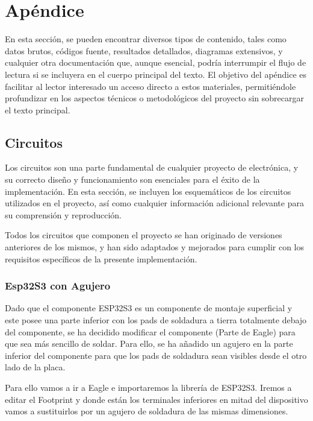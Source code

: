 \chapter{Apéndice}

En esta sección, se pueden encontrar diversos tipos de contenido, tales como datos brutos, códigos fuente, resultados detallados, diagramas extensivos, y cualquier otra documentación que, aunque esencial, podría interrumpir el flujo de lectura si se incluyera en el cuerpo principal del texto. El objetivo del apéndice es facilitar al lector interesado un acceso directo a estos materiales, permitiéndole profundizar en los aspectos técnicos o metodológicos del proyecto sin sobrecargar el texto principal.

\section{Circuitos}\label{ApendiceDiseñoEsquematico}

Los circuitos son una parte fundamental de cualquier proyecto de electrónica, y su correcto diseño y funcionamiento son esenciales para el éxito de la implementación. En esta sección, se incluyen los esquemáticos de los circuitos utilizados en el proyecto, así como cualquier información adicional relevante para su comprensión y reproducción.

Todos los circuitos que componen el proyecto se han originado de versiones anteriores de los mismos, y han sido adaptados y mejorados para cumplir con los requisitos específicos de la presente implementación.

\subsection{Esp32S3 con Agujero}\label{ApendiceEsp32Hole}
Dado que el componente ESP32S3 es un componente de montaje superficial y este posee una parte inferior con los pads de soldadura a tierra totalmente debajo del componente, se ha decidido modificar el componente (Parte de Eagle) para que sea más sencillo de soldar. Para ello, se ha añadido un agujero en la parte inferior del componente para que los pads de soldadura sean visibles desde el otro lado de la placa.

Para ello vamos a ir a Eagle e importaremos la librería de ESP32S3. Iremos a editar el \gls{Footprint} y donde están los terminales inferiores en mitad del dispositivo vamos a sustituirlos por un agujero de soldadura de las mismas dimensiones. 

